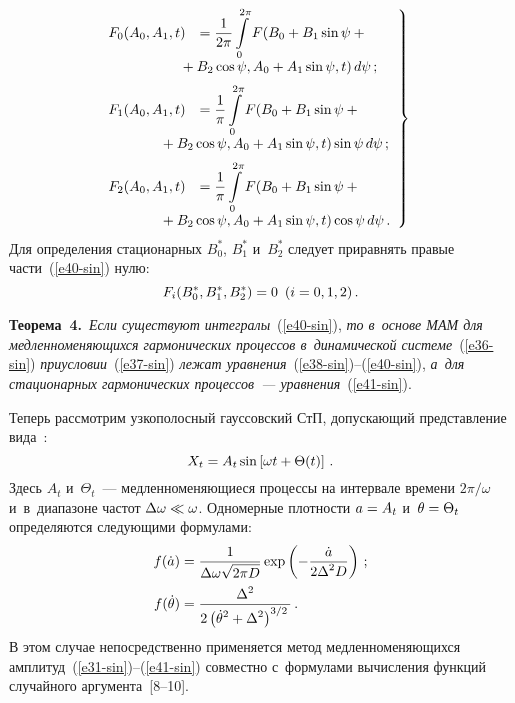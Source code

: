 \begin{multicols}{2}
\noindent
  \begin{equation}
  \left.
  \begin{array}{rl}
  \hspace*{-3mm}F_0 (A_0, A_1, t)&=\fr{1}{2\pi}
  \displaystyle\iii_0^{2\pi} F(B_0+B_1\sin \psi + {}\\[6pt]
&\hspace*{-5mm}  {}+
  B_2\cos \psi, A_0 + A_1 \sin\psi,t)\, d\psi\,;\\[6pt]
  \hspace*{-3mm}F_1 (A_0, A_1, t)&=\fr{1}{\pi}
\displaystyle\iii_0^{2\pi} F(B_0+B_1\sin \psi + {}\\[6pt]
&\hspace*{-10mm}{}+
B_2\cos \psi, A_0 + A_1 \sin\psi,t)\sin\psi \,d\psi\,;\\[6pt]
   \hspace*{-3mm}F_2 (A_0, A_1, t)&=\fr{1}{\pi}
 \displaystyle\iii_0^{2\pi} F(B_0+
 B_1\sin \psi +{}\\[6pt]
 &\hspace*{-10mm}{}+ B_2\cos \psi, A_0 + A_1 \sin\psi,t)\cos\psi\, d\psi\,.
 \end{array}
 \right\}
 \label{e40-sin}
 \end{equation}
Для определения стационарных $B_0^*$, $B_1^*$ и~$B_2^*$ следует приравнять 
правые части~(\ref{e40-sin}) нулю:
\begin{equation}
F_i (B_0^*, B_1^*, B_2^*) =0 \enskip (i=0,1,2)\,.\label{e41-sin}
\end{equation}

\noindent
\textbf{Теорема~4.}\ \textit{Если существуют интегралы}~(\ref{e40-sin}), 
\textit{то в~основе МАМ для мед\-лен\-но\-ме\-ня\-ющих\-ся гармонических процессов 
в~динамической системе}~(\ref{e36-sin}) \textit{при}\linebreak \textit{условии}~(\ref{e37-sin}) 
\textit{лежат уравнения}~(\ref{e38-sin})--(\ref{e40-sin}), 
\textit{а~для стационарных гармонических процессов~--- уравнения}~(\ref{e41-sin}).

\smallskip

Теперь рассмотрим узкополосный гауссовский СтП, допускающий представление вида~\cite{12-sin}:
\begin{equation*}
X_t = A_t \sin \left[ \omega t + \Theta (t)\right]\,.
\end{equation*}
Здесь $A_t$ и~$\Theta_t$~--- медленноменяющиеся процессы на интервале времени 
$2\pi /\omega$ и~в~диапазоне частот $\Delta \omega \hm\ll \omega$. Одномерные 
плотности $a\hm= A_t$ и~$\theta \hm= \Theta_t$ определяются следующими формулами:
\begin{align*}
f(\dot a) &= \displaystyle\frac{\displaystyle 1\mathstrut}{\displaystyle \Delta \omega \sqrt{2\pi D}\mathstrut} \exp \left( 
-\displaystyle\frac{\displaystyle \dot a\mathstrut}{\displaystyle 2\Delta^2 D\mathstrut} \right)\,;\\
f(\dot\theta) &= \displaystyle\frac{\displaystyle \Delta^2\mathstrut}{\displaystyle 2\left(\dot\theta^2 + \Delta^2\right)^{3/2}\mathstrut}\,.
\end{align*}
В этом случае непосредственно применяется метод медленноменяющихся 
амплитуд~(\ref{e31-sin})--(\ref{e41-sin}) совместно с~формулами вычисления функций 
случайного аргумента~[8--10].


\end{multicols}
